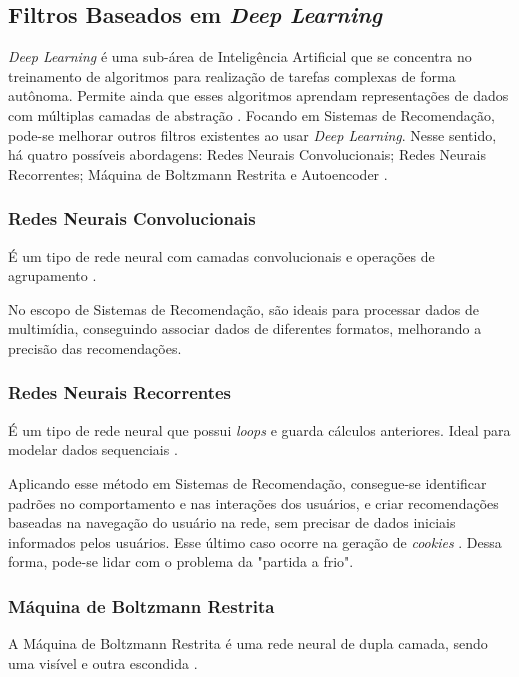 \subsection{Filtros Baseados em \textit{Deep Learning}}\label{subsec:filtrodeep}
\textit{Deep Learning} é uma sub-área de Inteligência Artificial que se concentra no treinamento de algoritmos para 
realização de tarefas complexas de forma autônoma. Permite ainda que esses algoritmos aprendam representações de 
dados com múltiplas camadas de abstração \cite{LeCun2015}. Focando em Sistemas de Recomendação, 
pode-se melhorar outros filtros existentes ao usar \textit{Deep Learning}. Nesse sentido, há quatro possíveis 
abordagens: Redes Neurais Convolucionais; Redes Neurais Recorrentes; Máquina de Boltzmann Restrita e Autoencoder 
\cite{elSisi2020}.

\subsubsection{Redes Neurais Convolucionais}\label{subsubsec:rnc}
É um tipo de rede neural com camadas convolucionais e operações de agrupamento \cite{elSisi2020}.

No escopo de Sistemas de Recomendação, são ideais para processar dados de multimídia, conseguindo associar dados de 
diferentes formatos, melhorando a precisão das recomendações.

\subsubsection{Redes Neurais Recorrentes}\label{subsubsec:rnr}
É um tipo de rede neural que possui \textit{loops} e guarda cálculos anteriores. Ideal para modelar dados sequenciais 
\cite{elSisi2020}.

Aplicando esse método em Sistemas de Recomendação, consegue-se identificar padrões no comportamento e nas interações dos usuários,
e criar recomendações baseadas na navegação do usuário na rede, sem precisar de dados iniciais informados pelos
usuários. Esse último caso ocorre na geração de \textit{cookies} \cite{elSisi2020}. Dessa forma, pode-se lidar com o problema 
da "partida a frio".

\subsubsection{Máquina de Boltzmann Restrita}\label{subsubsec:boltzmann}
A Máquina de Boltzmann Restrita é uma rede neural de dupla camada, sendo uma visível e outra escondida \cite{elSisi2020}. 

